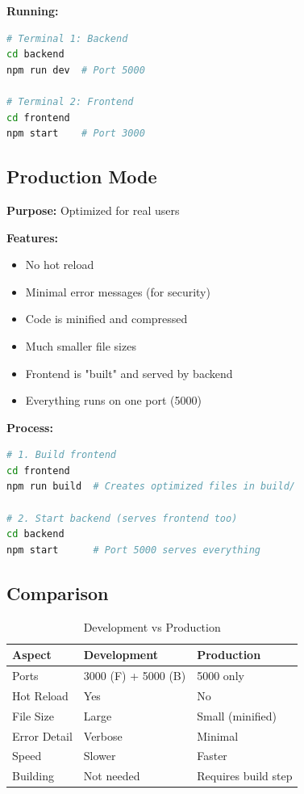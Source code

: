 \documentclass[12pt,a4paper]{article}
\begin{document}
\textbf{Running:}
\begin{lstlisting}[language=bash]
# Terminal 1: Backend
cd backend
npm run dev  # Port 5000

# Terminal 2: Frontend
cd frontend
npm start    # Port 3000
\end{lstlisting}

\subsection{Production Mode}

\textbf{Purpose:} Optimized for real users

\textbf{Features:}
\begin{itemize}
    \item No hot reload
    \item Minimal error messages (for security)
    \item Code is minified and compressed
    \item Much smaller file sizes
    \item Frontend is "built" and served by backend
    \item Everything runs on one port (5000)
\end{itemize}

\textbf{Process:}
\begin{lstlisting}[language=bash]
# 1. Build frontend
cd frontend
npm run build  # Creates optimized files in build/

# 2. Start backend (serves frontend too)
cd backend
npm start      # Port 5000 serves everything
\end{lstlisting}

\subsection{Comparison}

\begin{table}[h]
\centering
\begin{tabular}{|l|l|l|}
\hline
\textbf{Aspect} & \textbf{Development} & \textbf{Production} \\
\hline
Ports & 3000 (F) + 5000 (B) & 5000 only \\
\hline
Hot Reload & Yes & No \\
\hline
File Size & Large & Small (minified) \\
\hline
Error Detail & Verbose & Minimal \\
\hline
Speed & Slower & Faster \\
\hline
Building & Not needed & Requires build step \\
\hline
\end{tabular}
\caption{Development vs Production}
\end{table}
\end{document}
